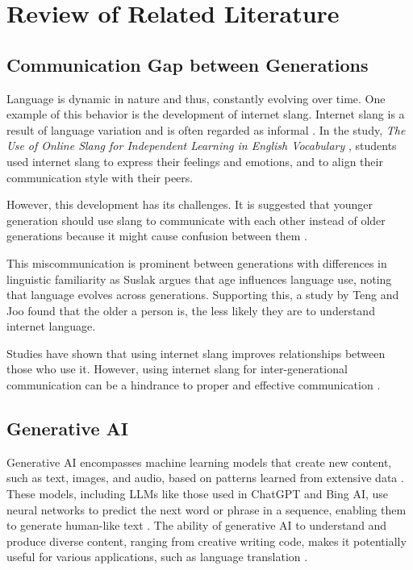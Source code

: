 \chapter{Review of Related Literature}
\label{sec:relatedlit}

\section{Communication Gap between Generations}
Language is dynamic in nature and thus, constantly evolving over time. One example of this behavior is the development of internet slang. Internet slang is a result of language variation and is often regarded as informal \cite{Liu_Gui_Zuo_Dai_2019}. In the study, \textit{The Use of Online Slang for Independent Learning in English Vocabulary} \cite{Ambarsari_Amrullah_Nawawi_2020}, students used internet slang to express their feelings and emotions, and to align their communication style with their peers. 

However, this development has its challenges. It is suggested that younger generation should use slang to communicate with each other instead of older generations because it might cause confusion between them \cite{Jeresano_Carretero_2022}.

This miscommunication is prominent between generations with differences in linguistic familiarity as Suslak \cite{SUSLAK2009199} argues that age influences language use, noting that language evolves across generations.
Supporting this, a study by Teng and Joo \cite{Teng_Joo2023} found that the older a person is, the less likely they are to understand internet language.

Studies have shown that using internet slang improves relationships between those who use it. However, using internet slang for inter-generational communication can be a hindrance to proper and effective communication \cite{gonzagaforda}.

\section{Generative AI}
Generative AI encompasses machine learning models that create new content, such as text, images, and audio, based on patterns learned from extensive data \cite{euchner2023generative}. These models, including LLMs like those used in ChatGPT and Bing AI, use neural networks to predict the next word or phrase in a sequence, enabling them to generate human-like text \cite{brynjolfsson2023generative}. The ability of generative AI to understand and produce diverse content, ranging from creative writing code, makes it potentially useful for various applications, such as language translation \cite{fui2023generative}. 

